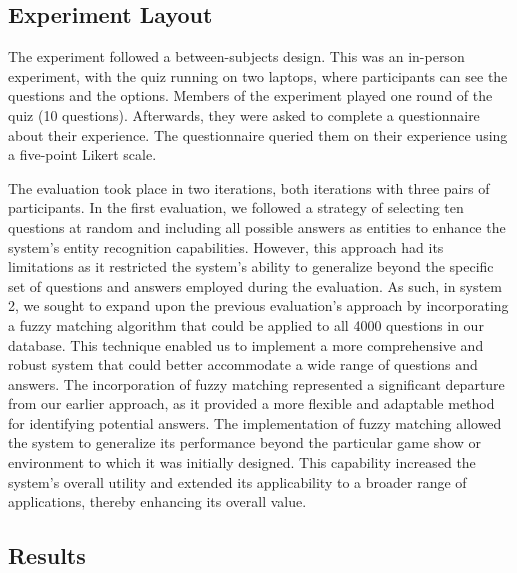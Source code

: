 \documentclass[hidelinks, 11pt]{article}
\begin{document}
\subsection{Experiment Layout}
\label{subsec:experiment_layout}
The experiment followed a between-subjects design. This was an in-person experiment, with the quiz running on two laptops, where participants can see the questions and the options. Members of the experiment played one round of the quiz (10 questions). Afterwards, they were asked to complete a questionnaire about their experience. The questionnaire queried them on their experience using a five-point Likert scale.

The evaluation took place in two iterations, both iterations with three pairs of participants. In the first evaluation, we followed a strategy of selecting ten questions at random and including all possible answers as entities to enhance the system's entity recognition capabilities. However, this approach had its limitations as it restricted the system's ability to generalize beyond the specific set of questions and answers employed during the evaluation. As such, in system 2, we sought to expand upon the previous evaluation's approach by incorporating a fuzzy matching algorithm that could be applied to all 4000 questions in our database. This technique enabled us to implement a more comprehensive and robust system that could better accommodate a wide range of questions and answers. The incorporation of fuzzy matching represented a significant departure from our earlier approach, as it provided a more flexible and adaptable method for identifying potential answers. The implementation of fuzzy matching allowed the system to generalize its performance beyond the particular game show or environment to which it was initially designed. This capability increased the system's overall utility and extended its applicability to a broader range of applications, thereby enhancing its overall value.

\subsection{Results}
\label{subsec:results}
\end{document}
